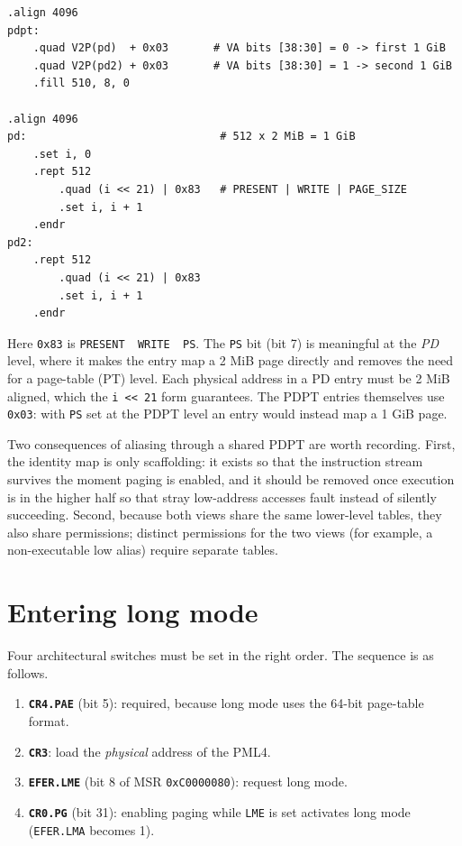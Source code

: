 \begin{lstlisting}[language=gas]
.align 4096
pdpt:
    .quad V2P(pd)  + 0x03       # VA bits [38:30] = 0 -> first 1 GiB
    .quad V2P(pd2) + 0x03       # VA bits [38:30] = 1 -> second 1 GiB
    .fill 510, 8, 0

.align 4096
pd:                              # 512 x 2 MiB = 1 GiB
    .set i, 0
    .rept 512
        .quad (i << 21) | 0x83   # PRESENT | WRITE | PAGE_SIZE
        .set i, i + 1
    .endr
pd2:
    .rept 512
        .quad (i << 21) | 0x83
        .set i, i + 1
    .endr
\end{lstlisting}

Here \texttt{0x83} is \texttt{PRESENT\ \textbar{}\ WRITE\ \textbar{}\ PS}. The \texttt{PS} bit (bit 7) is meaningful at the \emph{PD} level, where it makes the entry map a 2 MiB page directly and removes the need for a page-table (PT) level. Each physical address in a PD entry must be 2 MiB aligned, which the \texttt{i\ \textless{}\textless{}\ 21} form guarantees. The PDPT entries themselves use \texttt{0x03}: with \texttt{PS} set at the PDPT level an entry would instead map a 1 GiB page.

Two consequences of aliasing through a shared PDPT are worth recording. First, the identity map is only scaffolding: it exists so that the instruction stream survives the moment paging is enabled, and it should be removed once execution is in the higher half so that stray low-address accesses fault instead of silently succeeding. Second, because both views share the same lower-level tables, they also share permissions; distinct permissions for the two views (for example, a non-executable low alias) require separate tables.

\section{Entering long mode}

Four architectural switches must be set in the right order. The sequence is as follows.

\begin{enumerate}
\def\labelenumi{\arabic{enumi}.}
\tightlist
\item
  \textbf{\texttt{CR4.PAE}} (bit 5): required, because long mode uses the 64-bit page-table format.
\item
  \textbf{\texttt{CR3}}: load the \emph{physical} address of the PML4.
\item
  \textbf{\texttt{EFER.LME}} (bit 8 of MSR \texttt{0xC0000080}): request long mode.
\item
  \textbf{\texttt{CR0.PG}} (bit 31): enabling paging while \texttt{LME} is set activates long mode (\texttt{EFER.LMA} becomes 1).
\end{enumerate}

